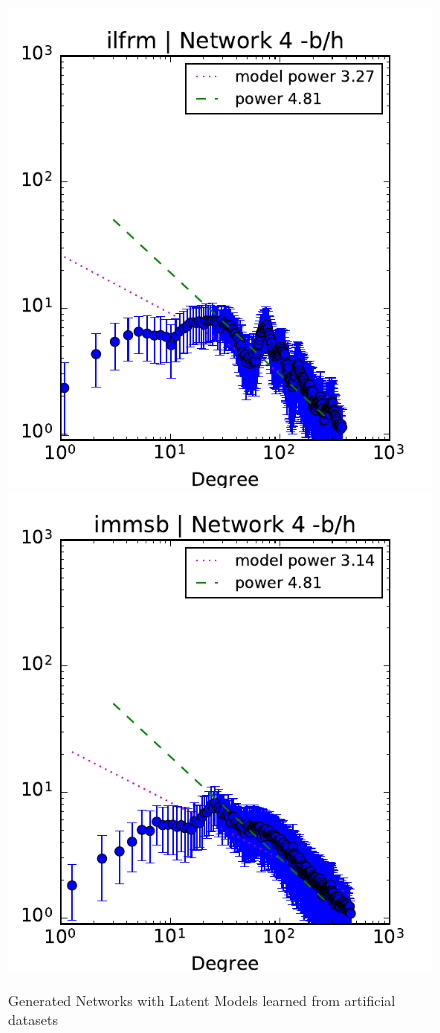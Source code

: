 \begin{figure}[h]
	\endminipage
	\vspace{-0.4cm}
	\includegraphics[scale=0.4]{img/ilfrm_g4_d}
	\endminipage
	\includegraphics[scale=0.4]{img/immsb_g4_d}
	\endminipage
	
	\caption{Generated Networks with Latent Models learned from artificial datasets}
	\label{fig:gen_graph_s}
\end{figure}

